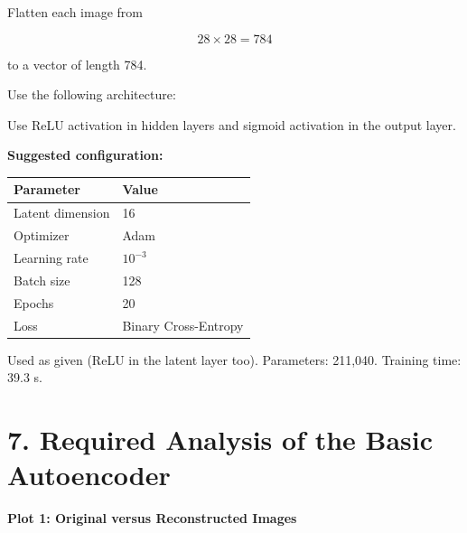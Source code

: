 \documentclass[10pt]{article}
\begin{document}
Flatten each image from

\[
28\times28=784
\]

to a vector of length 784.

Use the following architecture:

\begin{center}
\end{center}

Use ReLU activation in hidden layers and sigmoid activation in the output
layer.

\textbf{Suggested configuration:}

\begin{center}
\begin{tabular}{|l|l|}
\hline
Parameter & Value\\
\hline
Latent dimension & 16\\
Optimizer & Adam\\
Learning rate & $10^{-3}$\\
Batch size & 128\\
Epochs & 20\\
Loss & Binary Cross-Entropy\\
\hline
\end{tabular}
\end{center}

Used as given (ReLU in the latent layer too). Parameters: 211,040. Training time: 39.3 s.

\section*{7. Required Analysis of the Basic Autoencoder}

\textbf{Plot 1: Original versus Reconstructed Images}
\end{document}
